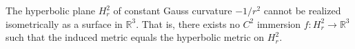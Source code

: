 The hyperbolic plane $H_r^2$ of constant Gauss curvature $-1/r^2$ cannot be realized isometrically as a surface in $\mathbb{R}^3$. That is, there exists no $C^2$ immersion $f: H_r^2 \rightarrow \mathbb{R}^3$ such that the induced metric equals the hyperbolic metric on $H_r^2$.